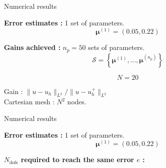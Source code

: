 \begin{frame}[noframenumbering]{Numerical results}
	\hspace{-5pt}\begin{minipage}[t]{0.46\linewidth}
		\textbf{Error estimates :} 1  set of parameters.
		$$\bm{\mu}^{(1)}=(0.05, 0.22) $$
		\vspace{-35pt}
		\begin{figure}[H]
		\end{figure}
	\end{minipage} \qquad \small
	\begin{minipage}[t]{0.48\linewidth}
		\textbf{Gains achieved :} $n_p=50$ sets of parameters.
		$$\mathcal{S}=\left\{\bm{\mu}^{(1)},\dots,\bm{\mu}^{(n_p)}\right\}$$
		\vspace{-15pt}
		\begin{table}[H]
		\end{table}

		\normalsize\centering\vspace{-20pt}
		$$N=20$$

		\vspace{-5pt}
		Gain : $\| u-u_h\|_{L^2} / \| u-u_h^+\|_{L^2}$ \\
		
		\small\vspace{8pt}
		Cartesian mesh : $N^2$ nodes.
	\end{minipage}
\end{frame}

\begin{frame}[noframenumbering]{Numerical results}
	\hspace{-5pt}\begin{minipage}[t]{0.46\linewidth}
		\textbf{Error estimates :} 1 set of parameters.
		$$\bm{\mu}^{(1)}=(0.05, 0.22) $$
		\vspace{-35pt}
		\begin{figure}[H]
		\end{figure}
	\end{minipage} \qquad \small
	\begin{minipage}[t]{0.48\linewidth}
		\textbf{$N_\text{dofs}$ required to reach the same error $e$ :}

		\vspace{10pt}
		\begin{table}[H]
			\centering
		\end{table}
	\end{minipage}
\end{frame}

